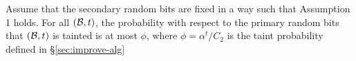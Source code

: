 \documentclass{acmsmall}
\newcommand{\cB}{{\cal B}}
\newcommand{\cC}{{\cal C}}
\newcommand{\Sec}[1]{\hyperref[sec:#1]{\S\ref*{sec:#1}}} %
\newcommand{\taintprob}{\phi}
\newcommand{\width}{{\bf {\rm  w}}}
\newcommand{\gridprec}{\alpha}
\newcommand{\errorcont}{\Psi}
\begin{document}
% 
%
%
%
\begin{lemma}
\label{lem:tainted}
Assume that the secondary random bits are fixed in a way such that Assumption 1 holds.
For all $(\cB,t)$, the probability with respect to the primary random bits that $(\cB,t)$ is tainted is at most  $\taintprob$,
where $\taintprob=\gridprec^t/C_2$ is the taint probability defined in \Sec{improve-alg}
\end{lemma}
\end{document}
